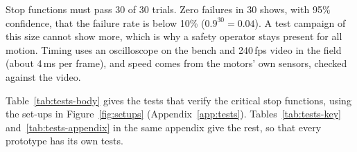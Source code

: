 Stop functions must pass 30 of 30 trials. Zero failures in 30 shows, with 95\% confidence, that the failure rate is below 10\% ($0.9^{30} = 0.04$). A test campaign of this size cannot show more, which is why a safety operator stays present for all motion. Timing uses an oscilloscope on the bench and 240\,fps video in the field (about 4\,ms per frame), and speed comes from the motors' own sensors, checked against the video.

\label{sec:vv-tests}

Table~\ref{tab:tests-body} gives the tests that verify the critical stop functions, using the set-ups in Figure~\ref{fig:setups} (Appendix~\ref{app:tests}). Tables~\ref{tab:tests-key} and~\ref{tab:tests-appendix} in the same appendix give the rest, so that every prototype has its own tests.

